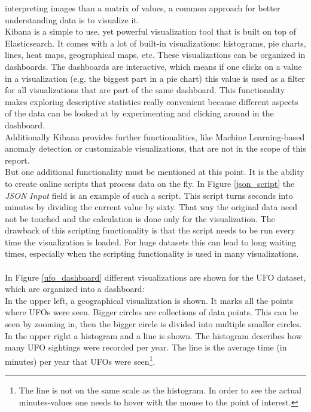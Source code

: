 \documentclass[bibliography=totoc]{article}
\begin{document}
interpreting images than a matrix of values, a common approach for better understanding data 
is to visualize it.
\\
Kibana is a simple to use, yet powerful visualization tool that is built on top 
of Elasticsearch. It comes with a lot of built-in visualizations: histograms, 
pie charts, lines, heat maps, geographical maps, etc. These visualizations can be organized
in dashboards. The dashboards are interactive, which means if one clicks on 
a value in a visualization (e.g. the biggest part in a pie chart) this value is used
as a filter for all visualizations that are part of the same dashboard.
This functionality makes exploring descriptive statistics really convenient 
because different aspects of the data can be looked at by experimenting and clicking
around in the dashboard.
\\
Additionally Kibana provides further functionalities, like Machine Learning-based anomaly detection or customizable visualizations, that are not in the scope of this report.
\\
But one additional functionality must be mentioned at this point. It is the 
ability to create online scripts that process data on the fly. In Figure \ref{json_script} 
the \textit{JSON Input} field is an example of such a script. This script turns seconds
into minutes by dividing the current value by sixty. That way the original data need not
be touched and the calculation is done only for the visualization. The drawback of this
scripting functionality is that the script needs to be run every time the visualization is loaded.
For huge datasets this can lead to long waiting times, especially when the scripting 
functionality is used in many visualizations.
\\
\\
In Figure \ref{ufo_dashboard} different visualizations are shown for the UFO dataset,
which are organized into a dashboard:
\\
In the upper left, a geographical visualization is shown. It marks all the points
where UFOs were seen. Bigger circles are collections of data points. This can be seen
by zooming in, then the bigger circle is divided into multiple smaller circles.
\\
In the upper right a histogram and a line is shown. The histogram describes
how many UFO sightings were recorded per year. The line is the average time 
(in minutes) per year that UFOs were seen\footnote{The line is not on the same scale as the histogram.
In order to see the actual minutes-values one needs to hover with the mouse to the point of interest.}.
\end{document}
